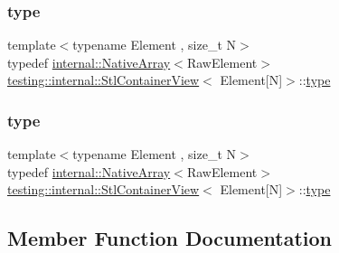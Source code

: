 \subsubsection{\texorpdfstring{type}{type}\hspace{0.1cm}{\footnotesize\ttfamily [2/3]}}
{\footnotesize\ttfamily template$<$typename Element , size\+\_\+t N$>$ \\
typedef \mbox{\hyperlink{classtesting_1_1internal_1_1_native_array}{internal\+::\+Native\+Array}}$<$Raw\+Element$>$ \mbox{\hyperlink{classtesting_1_1internal_1_1_stl_container_view}{testing\+::internal\+::\+Stl\+Container\+View}}$<$ Element\mbox{[}N\mbox{]}$>$\+::\mbox{\hyperlink{classtesting_1_1internal_1_1_stl_container_view_3_01_element[_n]_4_a364efca99cc5a02829b4e3413c506b09}{type}}}

\mbox{\label{classtesting_1_1internal_1_1_stl_container_view_3_01_element[_n]_4_a364efca99cc5a02829b4e3413c506b09}} 
\subsubsection{\texorpdfstring{type}{type}\hspace{0.1cm}{\footnotesize\ttfamily [3/3]}}
{\footnotesize\ttfamily template$<$typename Element , size\+\_\+t N$>$ \\
typedef \mbox{\hyperlink{classtesting_1_1internal_1_1_native_array}{internal\+::\+Native\+Array}}$<$Raw\+Element$>$ \mbox{\hyperlink{classtesting_1_1internal_1_1_stl_container_view}{testing\+::internal\+::\+Stl\+Container\+View}}$<$ Element\mbox{[}N\mbox{]}$>$\+::\mbox{\hyperlink{classtesting_1_1internal_1_1_stl_container_view_3_01_element[_n]_4_a364efca99cc5a02829b4e3413c506b09}{type}}}



\subsection{Member Function Documentation}
\mbox{\label{classtesting_1_1internal_1_1_stl_container_view_3_01_element[_n]_4_aa1b15d7f43d38751ae19f6dbdcb6aba3}} 
